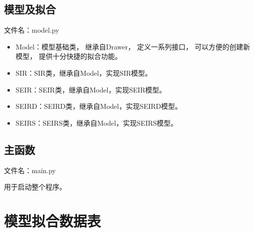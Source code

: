 \begin{appendix}
      \subsection*{模型及拟合}
      \par 文件名：model.py
      \begin{itemize}
            \item Model：模型基础类，
                  继承自Drawer，
                  定义一系列接口，
                  可以方便的创建新模型，
                  提供十分快捷的拟合功能。
            \item SIR：SIR类，继承自Model，实现SIR模型。
            \item SEIR：SEIR类，继承自Model，实现SEIR模型。
            \item SEIRD：SEIRD类，继承自Model，实现SEIRD模型。
            \item SEIRS：SEIRS类，继承自Model，实现SEIRS模型。
      \end{itemize}
      
      \subsection*{主函数}
      \par 文件名：main.py
      \par 用于启动整个程序。
      
      \section{模型拟合数据表\label{append:数据表}}
\end{appendix}